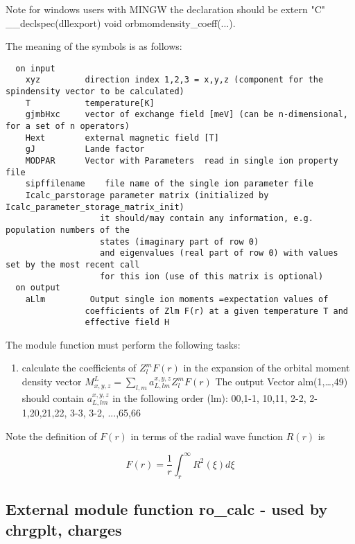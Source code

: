 Note for windows users with MINGW the declaration should be {\prg extern "C" \_\_declspec(dllexport) void %
orbmomdensity\_coeff(...)}.

The meaning of the symbols is as follows:
{\footnotesize
\begin{verbatim}
  on input
    xyz         direction index 1,2,3 = x,y,z (component for the spindensity vector to be calculated)
    T           temperature[K]
    gjmbHxc     vector of exchange field [meV] (can be n-dimensional, for a set of n operators)
    Hext        external magnetic field [T]
    gJ          Lande factor
    MODPAR      Vector with Parameters  read in single ion property file
    sipffilename    file name of the single ion parameter file
    Icalc_parstorage parameter matrix (initialized by Icalc_parameter_storage_matrix_init)
                   it should/may contain any information, e.g. population numbers of the
				   states (imaginary part of row 0)
                   and eigenvalues (real part of row 0) with values set by the most recent call
                   for this ion (use of this matrix is optional)
  on output
    aLlm         Output single ion moments =expectation values of
                coefficients of Zlm F(r) at a given temperature T and
                effective field H
\end{verbatim}
}

The module function must perform the following tasks:
\begin{enumerate}
\item calculate the coefficients of $Z_l^m F(r)$ in the expansion of
      the orbital moment
      density vector $M^L_{x,y,z}=\sum_{l,m} a^{x,y,z}_{L,lm} Z_l^m F(r)$
      The output Vector alm(1,\dots,49) should contain  $a^{x,y,z}_{L,lm}$
      in the following order (lm):  00,1-1, 10,11, 2-2, 2-1,20,21,22, 3-3, 3-2, ...,65,66
\end{enumerate}

Note the definition of $F(r)$ in terms of the radial wave function $R(r)$ is

\begin{equation}
F(r)=\frac{1}{r}\int_r^{\infty} R^2(\xi)d\xi
\end{equation}

\subsection{External module function {\prg ro\_calc} -
used by {\prg chrgplt},
{\prg charges}
}

